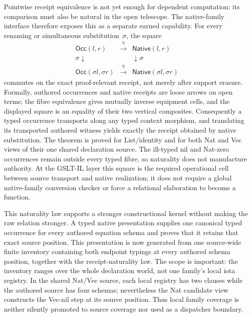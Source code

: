 \documentclass[11pt]{article}
\begin{document}
Pointwise receipt equivalence is not yet enough for dependent computation: its
comparison must also be natural in the open telescope.  The native-family
interface therefore exposes this as a separate earned capability.  For every
renaming or simultaneous substitution~$\sigma$, the square
\[
\begin{array}{ccc}
  \mathsf{Occ}(l,r) & \xrightarrow{\eta} & \mathsf{Native}(l,r) \\
  {\scriptstyle\sigma}\downarrow & & \downarrow{\scriptstyle\sigma} \\
  \mathsf{Occ}(\sigma l,\sigma r) & \xrightarrow{\eta} &
    \mathsf{Native}(\sigma l,\sigma r)
\end{array}
\]
commutes on the exact proof-relevant receipt, not merely after support erasure.
Formally, authored occurrences and native receipts are loose arrows on open
terms; the fibre equivalence gives mutually inverse equipment cells, and the
displayed square is an equality of their two vertical composites.
Consequently a typed occurrence transports along any typed context morphism,
and translating its transported authored witness yields exactly the receipt
obtained by native substitution.  The theorem is proved for List/identity and
for both Nat and Vec views of their one shared declaration source.  The
ill-typed nil and Nat-zero occurrences remain outside every typed fibre, so
naturality does not manufacture authority.  At the GSLT-IL layer this square is
the required operational cell between source transport and native realization;
it does not require a global native-family conversion checker or force a
relational elaboration to become a function.

This naturality law supports a stronger constructional kernel without making
the raw relation stronger.  A typed native presentation supplies one canonical
typed occurrence for every authored equation schema and proves that it retains
that exact source position.  This presentation is now generated from one
source-wide finite inventory containing both endpoint typings at every authored
schema position, together with the receipt-naturality law.  The scope is
important: the inventory ranges over the whole declaration world, not one
family's local iota registry.  In the shared Nat/Vec source, each local registry
has two clauses while the authored source has four schemas; nevertheless the
Nat candidate view constructs the Vec-nil step at its source position.  Thus
local family coverage is neither silently promoted to source coverage nor used
as a dispatcher boundary.
\end{document}
